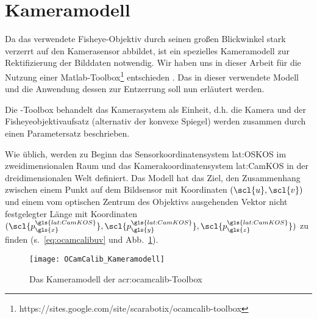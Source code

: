 \section{Kameramodell \dcsecondauthorshort} \label{sec:kameramodell}
Da das verwendete Fisheye-Objektiv durch seinen großen Blickwinkel stark verzerrt auf den Kamerasensor abbildet, ist ein spezielles Kameramodell zur Rektifizierung der Bilddaten notwendig. Wir haben uns in dieser Arbeit für die Nutzung einer Matlab-Toolbox\footnote{https://sites.google.com/site/scarabotix/ocamcalib-toolbox} entschieden  \autocite{scaramuzzaFlexibleTechniqueAccurate2006, scaramuzzaToolboxEasilyCalibrating2006, scaramuzzaOmnidirectionalVisionCalibration2007, rufliAutomaticDetectionCheckerboards2008}. Das in dieser verwendete Modell und die Anwendung dessen zur Entzerrung soll nun erläutert werden. 

Die -Toolbox behandelt das Kamerasystem als Einheit, d.h. die Kamera und der Fisheyeobjektivaufsatz (alternativ der konvexe Spiegel) werden zusammen durch einen Parametersatz beschrieben.

Wie üblich, werden zu Beginn das Sensorkoordinatensystem \gls{lat:OSKOS} im zweidimensionalen Raum und das Kamerakoordinatensystem \gls{lat:CamKOS} in der dreidimensionalen Welt definiert. Das Modell hat das Ziel, den Zusammenhang zwischen einem Punkt auf dem Bildsensor  mit Koordinaten \((\scl{u}, \scl{v})\) und einem vom optischen Zentrum des Objektivs ausgehenden Vektor nicht festgelegter Länge  mit Koordinaten \((\scl{p^{\gls{lat:CamKOS}}_{\gls{x}}}, \scl{p^{\gls{lat:CamKOS}}_{\gls{y}}}, \scl{p^{\gls{lat:CamKOS}}_{\gls{z}}})\) zu finden (s.~\eqref{eq:ocamcalibuv} und Abb.~\ref{fig:kameramodell}).

\begin{figure}[H]
  \centering
  \texttt{[image: OCamCalib\_Kameramodell]}
  \caption{Das Kameramodell der \gls{acr:ocamcalib}-Toolbox}
  \label{fig:kameramodell}
\end{figure}

